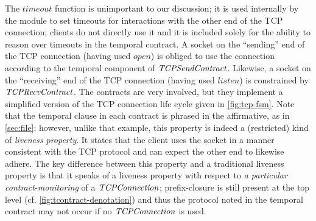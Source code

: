 {%
The $timeout$ function is unimportant to our discussion; it is used internally by the module to set timeouts for interactions with the other end of the TCP connection; clients do not directly use it and it is included solely for the ability to reason over timeouts in the temporal contract.
%
A socket on the ``sending'' end of the TCP connection (having used $open$) is obliged to use the connection according to the temporal component of $\mathit{TCPSendContract}$.
%
Likewise, a socket on the ``receiving'' end of the TCP connection (having used $listen$) is constrained by $\mathit{TCPRecvContract}$.
%
The contracts are very involved, but they implement a simplified version of the TCP connection life cycle given in \autoref{fig:tcp-fsm}.
%
Note that the temporal clause in each contract is phrased in the affirmative, as in \autoref{sec:file}; however, unlike that example, this property is indeed a (restricted) kind of \emph{liveness property}.
%
It states that the client uses the socket in a manner consistent with the TCP protocol and can expect the other end to likewise adhere.
%
The key difference between this property and a traditional liveness property is that it speaks of a liveness property with respect to \emph{a particular contract-monitoring} of a $\mathit{TCPConnection}$; prefix-closure is still present at the top level (cf. \autoref{fig:tcontract-denotation}) and thus the protocol noted in the temporal contract may not occur if no $\mathit{TCPConnection}$ is used.
}